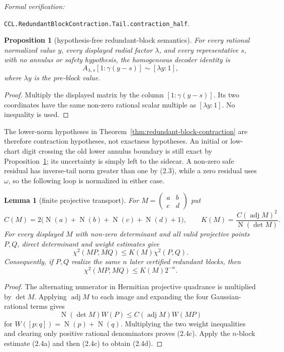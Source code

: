 \documentclass[10pt]{article}
\newtheorem{lemma}[theorem]{Lemma}
\newtheorem{proposition}[theorem]{Proposition}
\theoremstyle{definition}
\theoremstyle{remark}
\newcommand{\Norm}{\operatorname{N}}
\newcommand{\leanref}[1]{\par\smallskip\noindent
  \emph{Formal verification:}\par\nobreak
  {\raggedright\nolinkurl{#1}.\par}}
\newcommand{\Proj}[2]{[#1:#2]}
\newcommand{\mat}[4]{\begin{pmatrix}#1&#2\\#3&#4\end{pmatrix}}
\begin{document}
\leanref{CCL.RedundantBlockContraction.Tail.contraction_half}

\begin{proposition}[hypothesis-free redundant-block semantics]
\label{prop:redundant-block-exact}
For every rational normalized value $y$, every displayed radial factor
$\lambda$, and every representative $s$, with no annulus or safety
hypothesis, the homogeneous decoder identity is
\[
 A_{\lambda,s}
   \Proj{1}{\gamma(y-s)}\sim\Proj{\lambda y}{1},
\tag{2.4b}
\]
where $\lambda y$ is the pre-block value.
\end{proposition}

\begin{proof}
Multiply the displayed matrix by the column
$[1:\gamma(y-s)]$.  Its two coordinates have the same non-zero rational
scalar multiple as $[\lambda y:1]$.  No inequality is used.
\end{proof}

The lower-norm hypotheses in
Theorem~\ref{thm:redundant-block-contraction} are therefore contraction
hypotheses, not exactness hypotheses.  An initial or low-chart digit crossing
the old lower annulus boundary is still exact by
Proposition~\ref{prop:redundant-block-exact}; its uncertainty is simply left
to the sidecar.  A non-zero safe residual has inverse-tail norm greater than
one by (2.3), while a zero residual uses $\omega$, so the following loop is
normalized in either case.

\begin{lemma}[finite projective transport]
\label{lem:finite-projective-transport}
For
$M=\mat{a}{b}{c}{d}$ put
\[
 C(M)=2\bigl(\Norm(a)+\Norm(b)+\Norm(c)+\Norm(d)+1\bigr),
 \qquad
 K(M)=\frac{C(\operatorname{adj}M)^2}{\Norm(\det M)}.
\]
For every displayed $M$ with non-zero determinant and all valid projective
points $P,Q$, direct determinant and weight estimates give
\[
 \chi^2(MP,MQ)\le K(M)\chi^2(P,Q).
\tag{2.4c}
\]
Consequently, if $P,Q$ realize the same $n$ later certified redundant
blocks, then
\[
 \chi^2(MP,MQ)\le K(M)2^{-n}.
\tag{2.4d}
\]
\end{lemma}

\begin{proof}
The alternating numerator in Hermitian projective quadrance is multiplied by
$\det M$.  Applying $\operatorname{adj}M$ to each image and expanding the
four Gaussian-rational terms gives
\[
 \Norm(\det M)W(P)\le C(\operatorname{adj}M)W(MP)
\]
for $W([p:q])=\Norm(p)+\Norm(q)$.  Multiplying the two weight inequalities
and clearing only positive rational denominators proves (2.4c).
Apply the $n$-block estimate (2.4a) and then (2.4c) to obtain (2.4d).
\end{proof}
\end{document}
